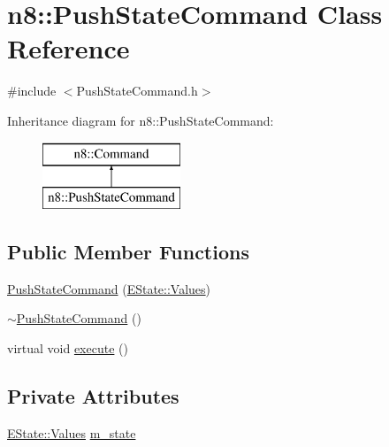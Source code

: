 \hypertarget{classn8_1_1_push_state_command}{\section{n8\-:\-:Push\-State\-Command Class Reference}
\label{classn8_1_1_push_state_command}
}


{\ttfamily \#include $<$Push\-State\-Command.\-h$>$}

Inheritance diagram for n8\-:\-:Push\-State\-Command\-:\begin{figure}[H]
\begin{center}
\leavevmode
\includegraphics[height=2.000000cm]{classn8_1_1_push_state_command}
\end{center}
\end{figure}
\subsection*{Public Member Functions}
\begin{DoxyCompactItemize}
\item 
\hyperlink{classn8_1_1_push_state_command_ae1c85b830260a6d29cf6f6d4730559ff}{Push\-State\-Command} (\hyperlink{namespace_e_state_aee586325ec9fecd1205d41439870dd81}{E\-State\-::\-Values})
\item 
\hyperlink{classn8_1_1_push_state_command_ab593c046bb4361ebae9a311dafe5a30b}{$\sim$\-Push\-State\-Command} ()
\item 
virtual void \hyperlink{classn8_1_1_push_state_command_ab3019fecfe1aee633c6d3b3cf68f2e70}{execute} ()
\end{DoxyCompactItemize}
\subsection*{Private Attributes}
\begin{DoxyCompactItemize}
\item 
\hyperlink{namespace_e_state_aee586325ec9fecd1205d41439870dd81}{E\-State\-::\-Values} \hyperlink{classn8_1_1_push_state_command_abd110a1cf9efc34960652d3aa90e4828}{m\-\_\-state}
\end{DoxyCompactItemize}


